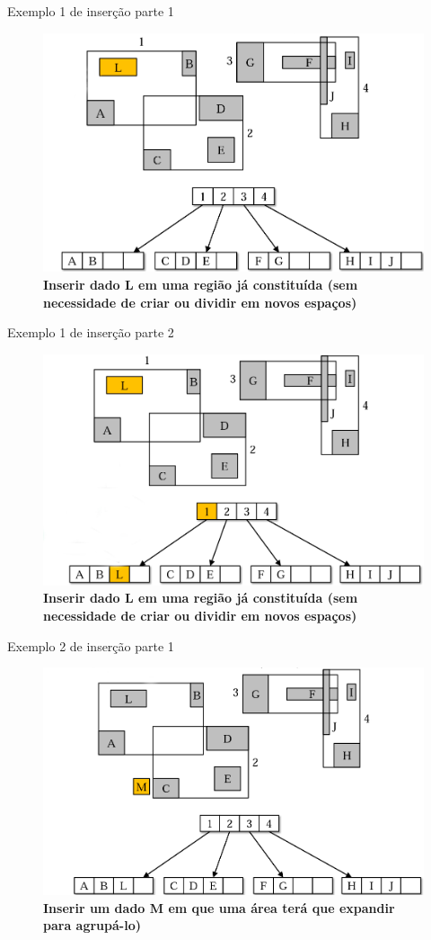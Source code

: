 \documentclass[compress,aspectratio=169]{beamer}
\begin{document}
\begin{frame}{Exemplo 1 de inserção parte 1}
\begin{figure}[] 
        \centering
        \includegraphics[width=0.65\linewidth]{insercao.png}
        \caption{\textbf{Inserir dado L em uma região já constituída (sem necessidade de criar ou dividir em novos espaços)}}
        \label{fig:enter-label}  
\end{figure}
\end{frame}

\begin{frame}{Exemplo 1 de inserção parte 2}
\begin{figure}[] 
        \centering
        \includegraphics[width=0.65\linewidth]{insercao2.jpg}
        \caption{\textbf{Inserir dado L em uma região já constituída (sem necessidade de criar ou dividir em novos espaços)}}
        \label{fig:enter-label}  
\end{figure}
\end{frame}

\begin{frame}{Exemplo 2 de inserção parte 1}
\begin{figure}[] 
        \centering
        \includegraphics[width=0.65\linewidth]{insercao3.jpg}
        \caption{\textbf{Inserir um dado M em que uma área terá que expandir para agrupá-lo)}}
        \label{fig:enter-label}  
\end{figure}
\end{frame}
\end{document}
